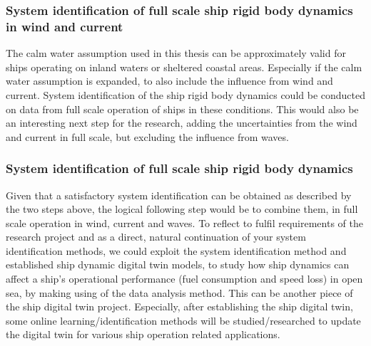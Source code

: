 \subsubsection*{System identification of full scale ship rigid body dynamics in wind and current}
The calm water assumption used in this thesis can be approximately valid for ships operating on inland waters or sheltered coastal areas. Especially if the calm water assumption is expanded, to also include the influence from wind and current. System identification of the ship rigid body dynamics could be conducted on data from full scale operation of ships in these conditions. This would also be an interesting next step for the research, adding the uncertainties from the wind and current in full scale, but excluding the influence from waves.

\subsubsection*{System identification of full scale ship rigid body dynamics}
Given that a satisfactory system identification can be obtained as described by the two steps above, the logical following step would be to combine them, in full scale operation in wind, current and waves. To reflect to fulfil requirements of the research project and as a direct, natural continuation of your system identification methods, we could exploit the system identification method and established ship dynamic digital twin models, to study how ship dynamics can affect a ship's operational performance (fuel consumption and speed loss) in open sea, by making using of the data analysis method. This can be another piece of the ship digital twin project. Especially, after establishing the ship digital twin, some online learning/identification methods will be studied/researched to update the digital twin for various ship operation related applications.